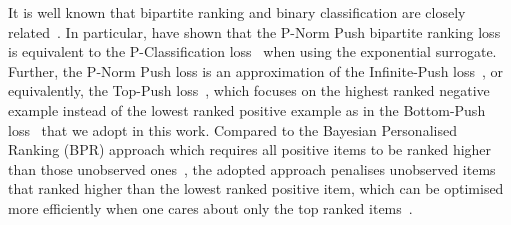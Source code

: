 It is well known
that bipartite ranking and binary classification are
closely related~\cite{ertekin2011equivalence,menon2016bipartite}.
In particular, \citet{ertekin2011equivalence} have shown that the P-Norm Push bipartite ranking loss~\cite{rudin2009p}
is equivalent to the P-Classification loss~\cite{ertekin2011equivalence} when using the exponential surrogate.
Further, the P-Norm Push loss is an approximation of the Infinite-Push loss~\cite{agarwal2011infinite},
or equivalently, the Top-Push loss~\cite{li2014top}, which focuses on the highest ranked negative example instead of
the lowest ranked positive example as in the Bottom-Push loss~\cite{rudin2009p} that we adopt in this work. %
%
Compared to the Bayesian Personalised Ranking (BPR) approach which requires all
positive items to be ranked higher than those unobserved ones~\cite{rendle2009bpr,mcfee2012million}, 
the adopted approach penalises unobserved items that ranked higher than the lowest ranked positive item,
which can be optimised more efficiently when one cares about only the top ranked items~\cite{rudin2009p,li2014top}.




